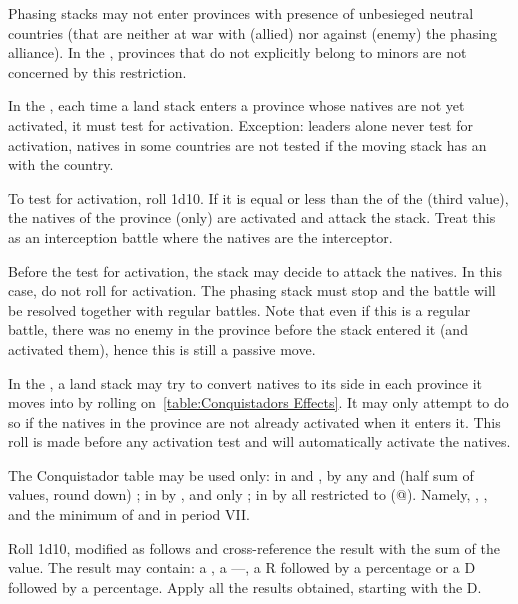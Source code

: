 Phasing stacks may not enter provinces with presence of unbesieged neutral
countries (that are neither at war with (allied) nor against (enemy) the
phasing alliance). In the \ROTW, provinces that do not explicitly belong to
minors are not concerned by this restriction.

In the \ROTW, each time a land stack enters a province whose natives are not
yet activated, it must test for activation. Exception: leaders alone never
test for activation, natives in some \ROTW countries are not tested if the
moving stack has an \dipAT with the country.

To test for activation, roll 1d10. If it is equal or less than the
 of the \Area (third value), the natives of the province
(only) are activated and attack the stack. Treat this as an interception
battle where the natives are the interceptor.

Before the test for activation, the stack may decide to attack the natives. In
this case, do not roll for activation. The phasing stack must stop and the
battle will be resolved together with regular battles. Note that even if this
is a regular battle, there was no enemy in the province before the stack
entered it (and activated them), hence this is still a passive move.

In the \ROTW, a land stack may try to convert natives to its side in each
province it moves into by rolling on~\ref{table:Conquistadors Effects}. It may
only attempt to do so if the natives in the province are not already activated
when it enters it. This roll is made before any activation test and will
automatically activate the natives.


The Conquistador table may be used only:
\bparag in  and , by any \LeaderC and
\LeaderE (half sum of values, round down) ;
\bparag in  by ,  and
 only ;
\bparag in  by all \LeaderC restricted to 
(@). Namely, , ,  and the minimum
\LeaderC@ of \FRA and \ANG in period VII.

Roll 1d10, modified as follows and cross-reference the result with the sum of
the \LeaderC value. The result may contain: a \textdag, a ---, a R followed by
a percentage or a D followed by a percentage. Apply all the results obtained,
starting with the D.

